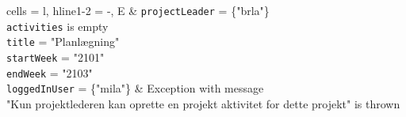 \begin{table}[H]
\begin{tblr}{
  cells = {l},
  hline{1-2} = {-}{},
}
E & 
{
    \texttt{projectLeader} = \{"brla"\} \\
    \texttt{activities} is empty \\
    \texttt{title} = "Planlægning" \\
    \texttt{startWeek} = "2101" \\ 
    \texttt{endWeek} = "2103" \\
    \texttt{loggedInUser} = \{"mila"\}
} & 
{
    Exception with message \\ 
    "Kun projektlederen kan oprette en projekt aktivitet for dette projekt" is thrown
} \\

\end{tblr}
\end{table}

